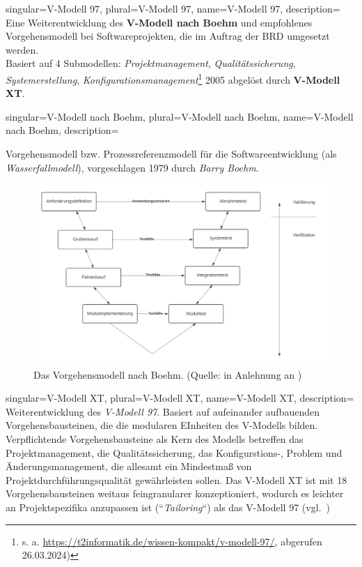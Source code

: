 
{
    singular={V-Modell 97},
    plural={V-Modell 97},
    name={V-Modell 97},
    description={
        Eine Weiterentwicklung des \textbf{V-Modell nach Boehm} und empfohlenes Vorgehensmodell bei Softwareprojekten, die im Auftrag der BRD umgesetzt werden.\\
        Basiert auf 4 Submodellen: \textit{Projektmanagement}, \textit{Qualitätssicherung}, \textit{Systemerstellung}, \textit{Konfigurationsmanagement}\footnote{s. a. \url{https://t2informatik.de/wissen-kompakt/v-modell-97/}, abgerufen 26.03.2024)}
        2005 abgelöst durch \textbf{V-Modell XT}.
    }
}

{
    singular={V-Modell nach Boehm},
    plural={V-Modell nach Boehm},
    name={V-Modell nach Boehm},
    description={
        Vorgehensmodell bzw. Prozessreferenzmodell für die Softwareentwicklung (als \textit{Wasserfallmodell}), vorgeschlagen 1979 durch \textit{Barry Boehm}.
        \begin{figure}
            \centering
            \includegraphics[scale=0.3]{chapters/Glossar/img/vmodell}
            \caption{Das Vorgehensmodell nach Boehm. (Quelle: in Anlehnung an \cite[329, Abbildung 14-7]{AABG14n})}
        \end{figure}
    }
}

{
    singular={V-Modell XT},
    plural={V-Modell XT},
    name={V-Modell XT},
    description={
        Weiterentwicklung des \textit{V-Modell 97}. Basiert auf aufeinander aufbauenden Vorgehensbausteinen, die die modularen EInheiten des V-Modells bilden. Verpflichtende Vorgehensbausteine als Kern des Modells betreffen das Projektmanagement, die Qualitätssicherung, das Konfigurstions-, Problem und Änderungsmanagement, die allesamt ein Mindestmaß von Projektdurchführungsqualität gewährleisten sollen. Das V-Modell XT ist mit 18 Vorgehensbausteinen weitaus feingranularer konzeptioniert, wodurch es leichter an Projektspezifika anzupassen ist (``\textit{Tailoring}``) als das V-Modell 97 (vgl.~\cite[329 f.]{AABG14n})
    }
}

